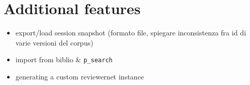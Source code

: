 \section{Additional features}
\label{sec:misccode}

\begin{itemize}
    \item export/load session snapshot (formato file, spiegare inconsistenza fra id di varie versioni del corpus)
    \item import from biblio \& \texttt{p\_search}
    \item generating a custom reviewernet instance
\end{itemize}